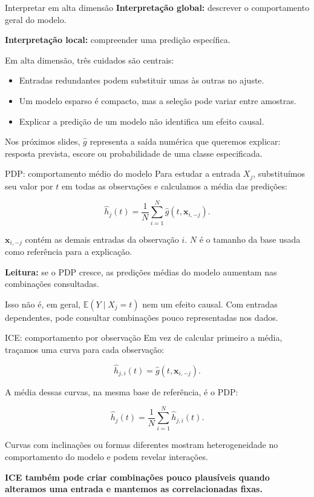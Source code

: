 \documentclass[
  10pt,
  ignorenonframetext,
  aspectratio=169,
  brazilian,
]{beamer}
\providecommand{\tightlist}{%
  \setlength{\itemsep}{0pt}\setlength{\parskip}{0pt}}
\begin{document}
\begin{frame}{Interpretar em alta dimensão}
\protect{}\label{interpretar-em-alta-dimensuxe3o}
\textbf{Interpretação global:} descrever o comportamento geral do
modelo.

\textbf{Interpretação local:} compreender uma predição específica.

Em alta dimensão, três cuidados são centrais:

\begin{itemize}
\tightlist
\item
  Entradas redundantes podem substituir umas às outras no ajuste.
\item
  Um modelo esparso é compacto, mas a seleção pode variar entre
  amostras.
\item
  Explicar a predição de um modelo não identifica um efeito causal.
\end{itemize}

Nos próximos slides, \(\hat g\) representa a saída numérica que queremos
explicar: resposta prevista, escore ou probabilidade de uma classe
especificada.
\end{frame}

\begin{frame}{PDP: comportamento médio do modelo}
\protect{}\label{pdp-comportamento-muxe9dio-do-modelo}
Para estudar a entrada \(X_j\), substituímos seu valor por \(t\) em
todas as observações e calculamos a média das predições:

\[
\boxed{\hat h_j(t)=\frac1N\sum_{i=1}^{N}\hat g(t,\mathbf x_{i,-j}).}
\]

\(\mathbf x_{i,-j}\) contém as demais entradas da observação \(i\).
\(N\) é o tamanho da base usada como referência para a explicação.

\textbf{Leitura:} se o PDP cresce, as predições médias do modelo
aumentam nas combinações consultadas.

Isso não é, em geral, \(\mathbb E(Y\mid X_j=t)\) nem um efeito causal.
Com entradas dependentes, pode consultar combinações pouco representadas
nos dados.
\end{frame}

\begin{frame}{ICE: comportamento por observação}
\protect{}\label{ice-comportamento-por-observauxe7uxe3o}
Em vez de calcular primeiro a média, traçamos uma curva para cada
observação:

\[
\hat h_{j,i}(t)=\hat g(t,\mathbf x_{i,-j}).
\]

A média dessas curvas, na mesma base de referência, é o PDP:

\[
\boxed{\hat h_j(t)=\frac1N\sum_{i=1}^{N}\hat h_{j,i}(t).}
\]

Curvas com inclinações ou formas diferentes mostram heterogeneidade no
comportamento do modelo e podem revelar interações.

\textbf{ICE também pode criar combinações pouco plausíveis quando
alteramos uma entrada e mantemos as correlacionadas fixas.}
\end{frame}
\end{document}
